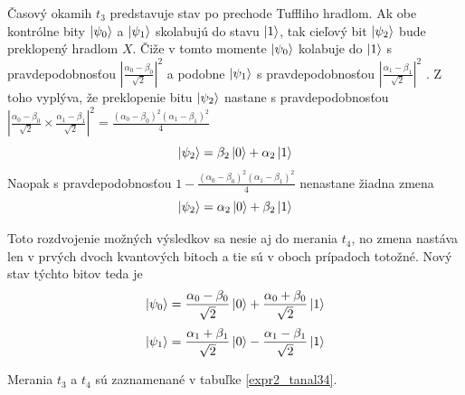 Časový okamih \(t_3\) predstavuje stav po prechode Tuffliho hradlom. Ak obe 
kontrólne bity \(\ket{\psi_0}\) a \(\ket{\psi_1}\) skolabujú do stavu 
\(\ket{1}\), tak cieľový bit \(\ket{\psi_2}\) bude preklopený hradlom \(X\).
Čiže v tomto momente \(\ket{\psi_0}\) kolabuje do \(\ket{1}\) s 
pravdepodobnosťou \(|\frac{\alpha_0 - \beta_0}{\sqrt{2}}|^2\) a podobne 
\(\ket{\psi_1}\) s pravdepodobnosťou \(|\frac{\alpha_1 - \beta_1}{\sqrt{2}}|^2\)
. Z toho vyplýva, že preklopenie bitu \(\ket{\psi_2}\) nastane
s pravdepodobnosťou  \(|\frac{\alpha_0 - \beta_0}{\sqrt{2}} \times \frac{\alpha_1 - \beta_1}{\sqrt{2}}|^2 = \frac{(\alpha_0 - \beta_0)^2(\alpha_1 - \beta_1)^2}{4}\)
\[\ket{\psi_2} = \beta_2\ket{0} + \alpha_2\ket{1}\]
Naopak s pravdepodobnosťou \(1 - \frac{(\alpha_0 - \beta_0)^2(\alpha_1 - \beta_1)^2}{4}\)
nenastane žiadna zmena
\[\ket{\psi_2} = \alpha_2\ket{0} + \beta_2\ket{1}\]

Toto rozdvojenie možných výsledkov sa nesie aj do merania \(t_4\), no zmena
nastáva len v prvých dvoch kvantových bitoch a tie sú v oboch prípadoch 
totožné. Nový stav týchto bitov teda je 
\[\ket{\psi_0} = \frac{\alpha_0 - \beta_0}{\sqrt{2}}\ket{0} + \frac{\alpha_0 + \beta_0}{\sqrt{2}}\ket{1}\]
\[\ket{\psi_1} = \frac{\alpha_1 + \beta_1}{\sqrt{2}}\ket{0} - \frac{\alpha_1 - \beta_1}{\sqrt{2}}\ket{1}\]

Merania \(t_3\) a \(t_4\) sú zaznamenané v tabuľke \ref{expr2_tanal34}.

